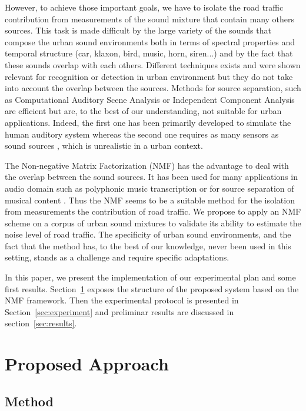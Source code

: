 \documentclass{article}
\begin{document}
\begin{sloppy}
However, to achieve those important goals, we have to isolate the road traffic contribution from measurements  of the sound mixture that contain many others sources. This task is made difficult by the large variety of the sounds that compose the urban sound environments both in terms of spectral properties and temporal structure (car, klaxon, bird, music, horn, siren...) and by the fact that these sounds overlap with each others. Different techniques exists and were shown relevant for recognition or detection in urban environment \cite{Aucouturier} \cite{defreville} but they do not take into account the overlap between the sources. Methods for source separation, such as Computational Auditory Scene Analysis \cite{} or Independent Component Analysis \cite{} are efficient but are, to the best of our understanding, not suitable for urban applications. Indeed, the first one has been primarily developed to simulate the human auditory system \cite{brown} whereas the second one requires as many sensors as sound sources \cite{Comon}, which is unrealistic in a urban context.

The Non-negative Matrix Factorization (NMF) \cite{lee1999} has the advantage to deal with the overlap between the sound sources. It has been used for many applications in audio domain such as polyphonic music transcription \cite{smaragdis2003} or for source separation of musical content \cite{Virtanen2005}. Thus the NMF seems to be a suitable method for the isolation from measurements the contribution of road traffic. We propose to apply an NMF scheme on a corpus of urban sound mixtures to validate its ability to estimate the  noise level of road traffic. The specificity of urban sound environments, and the fact that the method has, to the best of our knowledge, never been used in this setting, stands as a challenge and require specific adaptations.

In this paper, we present the implementation of our experimental plan and some first results. Section~\ref{sec:method} exposes the structure of the proposed system based on the NMF framework. Then the experimental protocol is presented in Section~\ref{sec:experiment}  and preliminar results are discussed in section~\ref{sec:results}.


\section{Proposed Approach}\label{sec:method}

\subsection{Method}


\end{sloppy}
\end{document}
